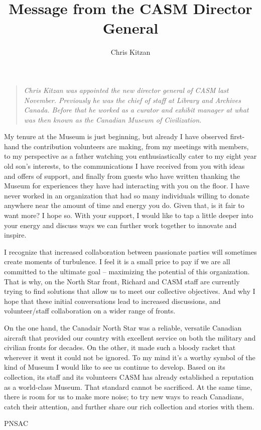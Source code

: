 %


\title{Message from the CASM Director General}
\author{Chris Kitzan}

\maketitle

\begin{quotation}
	\textit{Chris Kitzan was appointed the new director general of CASM last
	November. Previously he was the chief of staff at Library and Archives
	Canada. Before that he worked as a curator and exhibit manager at what
	was then known as the Canadian Museum of Civilization.}
\end{quotation}


My tenure at the Museum is just beginning, but already I have observed
first-hand the contribution volunteers are making, from my meetings
with members, to my perspective as a father watching you
enthusiastically cater to my eight year old son's interests, to the
communications I have received from you with ideas and offers of
support, and finally from guests who have written thanking the Museum
for experiences they have had interacting with you on the floor.  I
have never worked in an organization that had so many individuals
willing to donate anywhere near the amount of time and energy you do.
Given that, is it fair to want more?  I hope so.  With your support, I
would like to tap a little deeper into your energy and discuss ways we
can further work together to innovate and inspire.  

I recognize that increased collaboration between passionate parties
will sometimes create moments of turbulence.  I feel it is a small
price to pay if we are all committed to the ultimate goal --
maximizing the potential of this organization.  That is why, on the
North Star front, Richard and CASM staff are currently trying to find
solutions that allow us to meet our collective objectives.  And why I
hope that these initial conversations lead to increased discussions,
and volunteer/staff collaboration on a wider range of fronts.  

On the one hand, the Canadair North Star was a reliable, versatile
Canadian aircraft that provided our country with excellent service on
both the military and civilian fronts for decades.  On the other, it
made such a bloody racket that wherever it went it could not be
ignored.  To my mind it's a worthy symbol of the kind of Museum I
would like to see us continue to develop.  Based on its collection,
its staff and its volunteers CASM has already established a reputation
as a world-class Museum.    That standard cannot be sacrificed.  At
the same time, there is room for us to make more noise; to try new
ways to reach Canadians, catch their attention, and further share our
rich collection and stories with them. 

\begin{footnotesize}
  \raggedleft PNSAC\\
\end{footnotesize}



